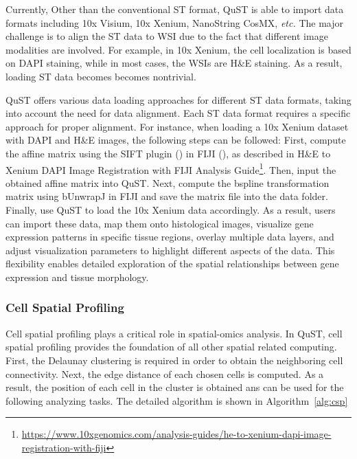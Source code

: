 \documentclass{article}
\begin{document}
Currently, Other than the conventional ST format, QuST is able to import data formats including 10x Visium, 10x Xenium, NanoString CosMX, \textit{etc.} The major challenge is to align the ST data to WSI due to the fact that different image modalities are involved. For example, in 10x Xenium, the cell localization is based on DAPI staining, while in most cases, the WSIs are H\&E staining. As a result, loading ST data becomes becomes nontrivial.

QuST offers various data loading approaches for different ST data formats, taking into account the need for data alignment. Each ST data format requires a specific approach for proper alignment. For instance, when loading a 10x Xenium dataset with DAPI and H\&E images, the following steps can be followed: First, compute the affine matrix using the SIFT plugin (\cite{Lowe:2004}) in FIJI (\cite{ Schindelin:2012}), as described in H\&E to Xenium DAPI Image Registration with FIJI Analysis Guide\footnote{\url{https://www.10xgenomics.com/analysis-guides/he-to-xenium-dapi-image-registration-with-fiji}}. Then, input the obtained affine matrix into QuST. Next, compute the bspline transformation matrix using bUnwrapJ in FIJI and save the matrix file into the data folder. Finally, use QuST to load the 10x Xenium data accordingly. As a result, users can import these data, map them onto histological images, visualize gene expression patterns in specific tissue regions, overlay multiple data layers, and adjust visualization parameters to highlight different aspects of the data. This flexibility enables detailed exploration of the spatial relationships between gene expression and tissue morphology.

\subsubsection{Cell Spatial Profiling}
\label{sec:spatialprofiling}

Cell spatial profiling plays a critical role in spatial-omics analysis. In QuST, cell spatial profiling provides the foundation of all other spatial related computing. First, the Delaunay clustering is required in order to obtain the neighboring cell connectivity. Next, the edge distance of each chosen cells is computed. As a result, the position of each cell in the cluster is obtained ans can be used for the following analyzing tasks. The detailed algorithm is shown in Algorithm~\ref{alg:csp}
\end{document}
